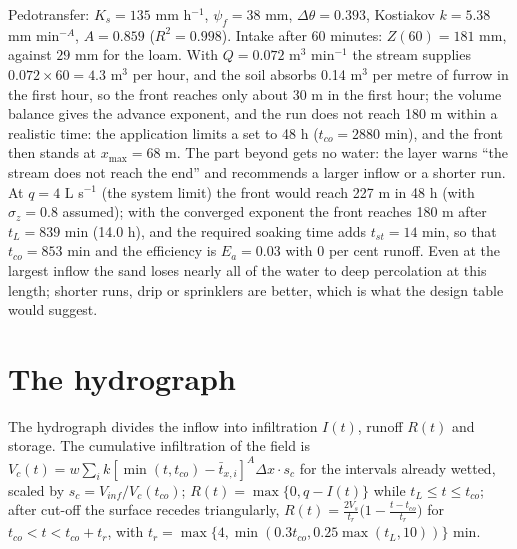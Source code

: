 \sol {}\ans Pedotransfer: $K_s=135$ mm h$^{-1}$, $\psi_f=38$ mm, $\Delta\theta=0.393$, Kostiakov $k=5.38$ mm min$^{-A}$, $A=0.859$ ($R^2=0.998$). Intake after 60 minutes: $Z(60)=181$ mm, against $29$ mm for the loam. With $Q=0.072$ m$^3$ min$^{-1}$ the stream supplies $0.072\times60=4.3$ m$^3$ per hour, and the soil absorbs 0.14 m$^3$ per metre of furrow in the first hour, so the front reaches only about 30 m in the first hour; the volume balance gives the advance exponent, and the run does not reach 180 m within a realistic time: the application limits a set to 48 h ($t_{co}=2880$ min), and the front then stands at $x_{\max}=68$ m. The part beyond gets no water: the layer warns ``the stream does not reach the end'' and recommends a larger inflow or a shorter run. At $q=4$ L s$^{-1}$ (the system limit) the front would reach 227 m in 48 h (with $\sigma_z=0.8$ assumed); with the converged exponent the front reaches 180 m after $t_L=839$ min (14.0 h), and the required soaking time adds $t_{st}=14$ min, so that $t_{co}=853$ min and the efficiency is $E_a=0.03$ with $0$ per cent runoff. Even at the largest inflow the sand loses nearly all of the water to deep percolation at this length; shorter runs, drip or sprinklers are better, which is what the design table would suggest. \finans


\section{The hydrograph}
The hydrograph divides the inflow into infiltration $I(t)$, runoff $R(t)$ and storage. The cumulative infiltration of the field is $V_c(t)=w\sum_ik[\min(t,t_{co})-\bar t_{x,i}]^A\Delta x\cdot s_c$ for the intervals already wetted, scaled by $s_c=V_{inf}/V_c(t_{co})$; $R(t)=\max\{0,q-I(t)\}$ while $t_L\le t\le t_{co}$; after cut-off the surface recedes triangularly, $R(t)=\frac{2V_s}{t_r}\bigl(1-\frac{t-t_{co}}{t_r}\bigr)$ for $t_{co}<t<t_{co}+t_r$, with $t_r=\max\{4,\min(0.3t_{co},0.25\max(t_L,10))\}$ min.

